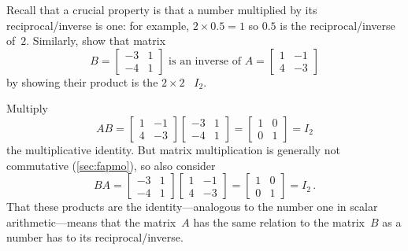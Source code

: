\begin{example} \label{eg:a2x2inv}
Recall that a crucial property is that a number multiplied by its reciprocal\slash inverse is one: for example, \(2\times 0.5=1\) so \(0.5\) is the reciprocal\slash inverse of~\(2\).
Similarly, show that matrix 
\begin{equation*}
B=\begin{bmatrix} -3&1\\-4&1 \end{bmatrix}
\text{ is an inverse of }
A=\begin{bmatrix} 1&-1\\4&-3 \end{bmatrix}
\end{equation*}
by showing their product is the \(2\times2\) ~\(I_2\).
\begin{solution} 
Multiply 
\begin{equation*}
AB=\begin{bmatrix} 1&-1\\4&-3 \end{bmatrix}
\begin{bmatrix} -3&1\\-4&1 \end{bmatrix}
=\begin{bmatrix} 1&0\\0&1 \end{bmatrix}=I_2
\end{equation*}
the multiplicative identity.  
But matrix multiplication is generally not commutative (\autoref{sec:fapmo}), so also consider
\begin{equation*}
BA=\begin{bmatrix} -3&1\\-4&1 \end{bmatrix}
\begin{bmatrix} 1&-1\\4&-3 \end{bmatrix}
=\begin{bmatrix} 1&0\\0&1 \end{bmatrix}=I_2\,.
\end{equation*}
That these products are the identity---analogous to the number one in scalar arithmetic---means that the matrix~\(A\) has the same relation to the matrix~\(B\) as a number has to its reciprocal\slash inverse.
%


\end{solution}
\end{example}
